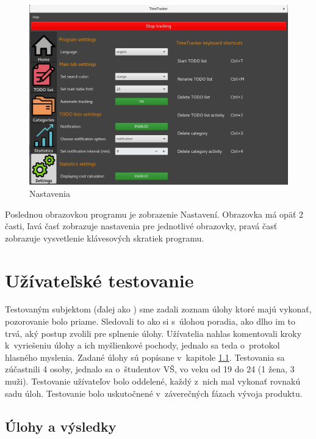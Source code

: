 \documentclass[]{article}
\begin{document}
\begin{figure}[h!]
	\includegraphics[width=\textwidth]{nastavenia}
	\caption{Nastavenia}
\end{figure}

Poslednou obrazovkou programu je zobrazenie Nastavení. Obrazovka má opäť 2 časti, ľavá časť zobrazuje nastavenia pre jednotlivé obrazovky, pravá časť zobrazuje vysvetlenie klávesových skratiek programu.

\newpage

\section{Užívateľské testovanie}

Testovaným subjektom (ďalej ako ) sme zadali zoznam úlohy ktoré majú vykonať, pozorovanie bolo priame\cite{vyhodnotenie}. Sledovali to ako si s~úlohou poradia, ako dlho im to trvá, aký postup zvolili pre splnenie úlohy. Užívatelia nahlas komentovali kroky k~vyriešeniu úlohy a ich myšlienkové pochody, jednalo sa teda o~protokol hlasného myslenia\cite{vyhodnotenie}. Zadané úlohy sú popísane v~kapitole \ref{ulohy}. Testovania sa zúčastnili 4 osoby, jednalo sa o~študentov VŠ, vo veku od 19 do 24 (1 žena, 3 muži). Testovanie užívateľov bolo oddelené, každý z~nich mal vykonať rovnakú sadu úloh. Testovanie bolo uskutočnené v~záverečných fázach vývoja produktu. 

\subsection{Úlohy a výsledky}
\label{ulohy}
\end{document}
